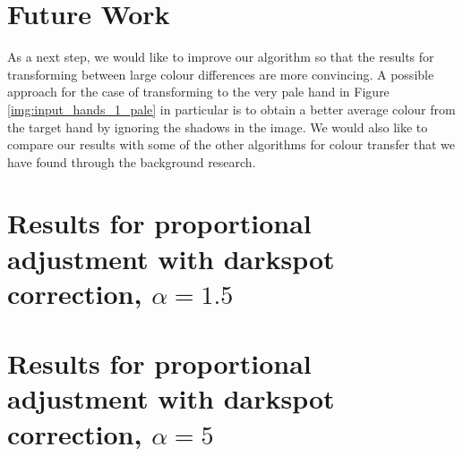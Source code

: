 \documentclass[12pt, a4paper]{article}
\begin{document}
\section{Future Work}
As a next step, we would like to improve our algorithm so that the results for transforming between large colour differences are more convincing. A possible approach for the case of transforming to the very pale hand in Figure \ref{img:input_hands_1_pale} in particular is to obtain a better average colour from the target hand by ignoring the shadows in the image. We would also like to compare our results with some of the other algorithms for colour transfer that we have found through the background research.
\pagebreak



\pagebreak

\appendix
\section{Results for proportional adjustment with darkspot correction, $\alpha = 1.5$}\label{app:prop_corr_ave_a1p5}


\section{Results for proportional adjustment with darkspot correction, $\alpha = 5$}\label{app:prop_corr_ave_a5}


% 

% 

% 
\end{document}
